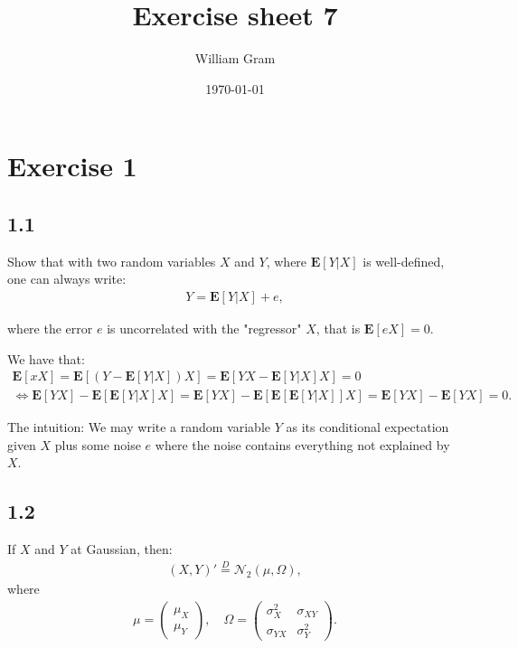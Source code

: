\documentclass[11pt,a4paper,oneside]{article}
\title{Exercise sheet 7}
\author{William Gram}
\date{\today}
\newcommand{\LL}{\Leftrightarrow}
\newcommand{\lp}{\left(}
\newcommand{\rp}{\right)}
\newcommand{\rb}{\right]}
\newcommand{\lb}{\left[}
\newcommand{\ee}{\mathbf{E}}
\newcommand{\nnn}{\mathcal{N}}
\begin{document}
\maketitle

\rfoot{\thepage}

\section{Exercise 1}
\renewcommand{\theequation}{1.\arabic{equation}}
\setcounter{equation}{0}

\subsection{1.1}
Show that with two random variables $X$ and $Y$, where $\ee\lb Y \vert X\rb$ is well-defined, one can always write:
\begin{align}
    Y = \ee\lb Y \vert X\rb + e,
\end{align}

where the error $e$ is uncorrelated with the "regressor" $X$, that is $\ee\lb e X\rb = 0$.

We have that:
\begin{gather*}
    \ee\lb x X\rb = \ee\lb \lp Y - \ee\lb Y\vert X\rb \rp X\rb = \ee\lb Y X - \ee\lb Y\vert X\rb X \rb = 0\\
    \LL \ee\lb Y X\rb - \ee\lb \ee\lb Y\vert X\rb X\rb = \ee\lb YX \rb - \ee\lb \ee\lb \ee\lb Y \vert X\rb \rb X\rb = \ee\lb YX\rb - \ee\lb YX\rb = 0.
\end{gather*}

The intuition: We may write a random variable $Y$ as its conditional expectation given $X$ plus some noise $e$ where the noise contains everything not explained by $X$.

\subsection{1.2}
If $X$ and $Y$ at Gaussian, then:
\begin{align}
    \lp X, Y\rp' \overset{D}{=} \nnn_2\lp \mu, \Omega\rp,
\end{align}
where
\begin{align}
    \mu = \begin{pmatrix} \mu_X \\ \mu_Y\end{pmatrix}, \quad
    \Omega = 
        \begin{pmatrix}
            \sigma_X^2 & \sigma_{XY} \\
            \sigma_{YX}& \sigma_Y^2
        \end{pmatrix}.
\end{align}
\end{document}
